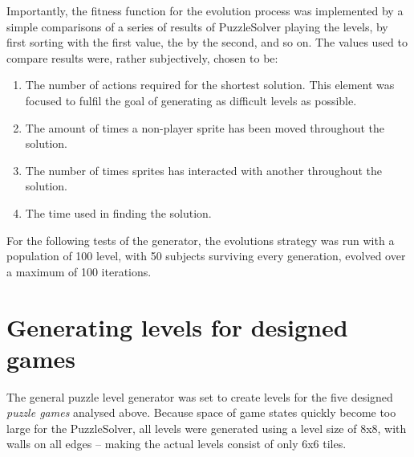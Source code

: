 \documentclass[a4paper,titlepage,final]{report}
\begin{document}
Importantly, the fitness function for the evolution process was implemented by a simple comparisons of a series of results of PuzzleSolver playing the levels, by first sorting with the first value, the by the second, and so on. 
The values used to compare results were, rather subjectively, chosen to be:

\begin{enumerate}
\item The number of actions required for the shortest solution. This element was focused to fulfil the goal of generating as difficult levels as possible.
\item The amount of times a non-player sprite has been moved throughout the solution.
\item The number of times sprites has interacted with another throughout the solution.
\item The time used in finding the solution.
\end{enumerate}

For the following tests of the generator, the evolutions strategy was run with a population of 100 level, with 50 subjects surviving every generation, evolved over a maximum of 100 iterations.





%






\section{Generating levels for designed games} 
\label{sec_task3evolvingLevelsResults}
The general puzzle level generator was set to create levels for the five designed \textit{puzzle games} analysed above.
Because space of game states quickly become too large for the PuzzleSolver, all levels were generated using a level size of 8x8, with walls on all edges -- making the actual levels consist of only 6x6 tiles.
\end{document}
